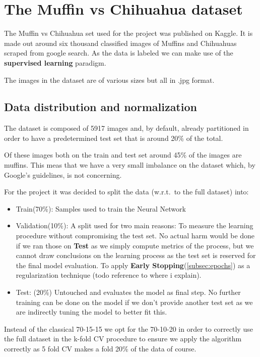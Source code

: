 \newpage
\section{The Muffin vs Chihuahua dataset}\label{sec:the-muffin-vs-chihuahua-dataset}

The Muffin vs Chihuahua set used for the project was published on Kaggle\cite{datasetCite}.
It is made out around six thousand classified images of Muffins and Chihuahuas scraped from google search.
As the data is labeled we can make use of the \textbf{supervised learning} paradigm.

The images in the dataset are of various sizes but all in .jpg format.

\subsection{Data distribution and normalization}
The dataset is composed of 5917 images and, by default, already partitioned in order to have a predetermined test set that is around 20\% of the total.

Of these images both on the train and test set around 45\% of the images are muffins. This meas that we have a very small
imbalance on the dataset which, by Google's\cite{googleBalance} guidelines, is not concerning.

For the project it was decided to split the data (w.r.t.\ to the full dataset) into:
\begin{itemize}
    \item Train(70\%): Samples used to train the Neural Network
    \item Validation(10\%): A split used for two main reasons:
    \subitem To measure the learning procedure without compromising the test set.
    No actual harm would be done if we ran those on \textbf{Test} as we simply compute metrics of the process,
    but we cannot draw conclusions on the learning process as the test set is reserved for the final model evaluation.
    \subitem To apply \textbf{Early Stopping}(\ref{subsec:epochs}) as a regularization technique (todo reference to where i explain).
    \item Test: (20\%) Untouched and evaluates the model as final step. No further training can be done on the model
    if we don't provide another test set as we are indirectly tuning the model to better fit this.
\end{itemize}

Instead of the classical 70-15-15 we opt for the 70-10-20 in order to correctly use the full dataset in the
k-fold CV procedure to ensure we apply the algorithm correctly as 5 fold CV makes a fold 20\% of the data of course.

